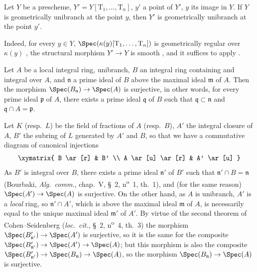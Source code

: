 \begin{lemma}[14.4.1.1]
\label{IV.14.4.1.1}
Let $Y$ be a prescheme, $Y'=Y[\mathrm{T}_1,\ldots,\mathrm{T}_n]$, $y'$ a point of $Y'$, $y$ its image in $Y$.
If $Y$ is geometrically unibranch at the point $y$, then $Y'$ is geometrically unibranch at the point $y'$.
\end{lemma}

Indeed, for every $y\in Y$, $\Spec(\kappa(y)[\mathrm{T}_1,\ldots,\mathrm{T}_n])$ is geometrically regular over $\kappa(y)$ , the structural morphism $Y'\to Y$ is smooth , and it suffices to apply .

\begin{lemma}[14.4.1.2]
\label{IV.14.4.1.2}
Let $A$ be a local integral ring, unibranch, $B$ an integral ring containing and integral over $A$, and $\mathfrak{n}$ a prime ideal of $B$ above the maximal ideal $\mathfrak{m}$ of $A$.
Then the morphism $\Spec(B_\mathfrak{n})\to\Spec(A)$ is surjective, in other words, for every prime ideal $\mathfrak{p}$ of $A$, there exists a prime ideal $\mathfrak{q}$ of $B$ such that $\mathfrak{q}\subset\mathfrak{n}$ and $\mathfrak{q}\cap A=\mathfrak{p}$.
\end{lemma}

Let $K$ (resp.\ $L$) be the field of fractions of $A$ (resp.\ $B$), $A'$ the integral closure of $A$, $B'$ the subring of $L$ generated by $A'$ and $B$, so that we have a commutative diagram of canonical injections
\[
  \xymatrix{
    B \ar[r] & B' \\
    A \ar[u] \ar[r] & A' \ar[u]
  }
\]
As $B'$ is integral over $B$, there exists a prime ideal $\mathfrak{n}'$ of $B'$ such that $\mathfrak{n}'\cap B=\mathfrak{n}$ (Bourbaki, \emph{Alg.\ comm.}, chap.~V, \S~2, n\textsuperscript{o}~1, th.~1), and (for the same reason) $\Spec(A')\to\Spec(A)$ is surjective.
On the other hand, as $A$ is unibranch, $A'$ is a \emph{local} ring, so $\mathfrak{n}'\cap A'$, which is above the maximal ideal $\mathfrak{m}$ of $A$, is necessarily equal to the unique maximal ideal $\mathfrak{m}'$ of $A'$.
By virtue of the second theorem of Cohen--Seidenberg (\emph{loc.\ cit.}, \S~2, n\textsuperscript{o}~4, th.~3) the morphism $\Spec(B'_{\mathfrak{n}'})\to\Spec(A')$ is surjective, so it is the same for the composite $\Spec(B'_{\mathfrak{n}'})\to\Spec(A')\to\Spec(A)$; but this morphism is also the composite $\Spec(B'_{\mathfrak{n}'})\to\Spec(B_\mathfrak{n})\to\Spec(A)$, so the morphism $\Spec(B_\mathfrak{n})\to\Spec(A)$ is surjective.

